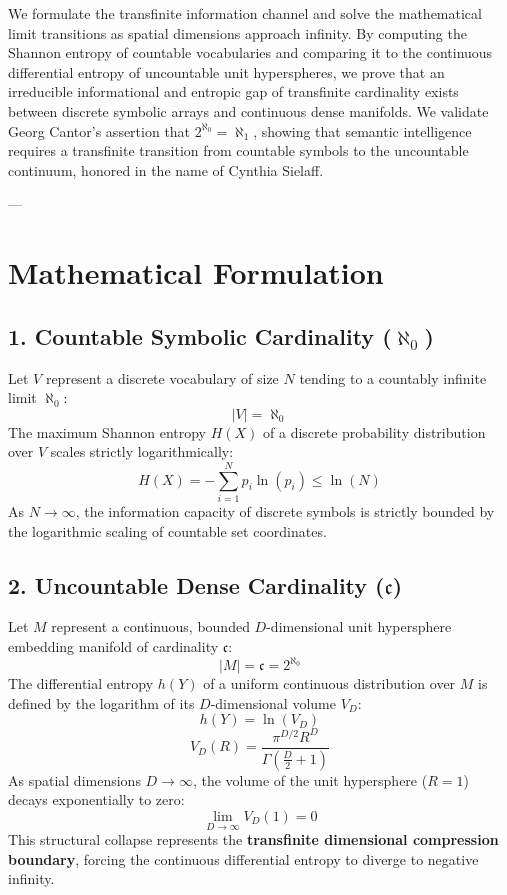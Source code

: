 \documentclass[11pt,twocolumn]{article}
\begin{document}
We formulate the transfinite information channel and solve the mathematical limit transitions as spatial dimensions approach infinity. By computing the Shannon entropy of countable vocabularies and comparing it to the continuous differential entropy of uncountable unit hyperspheres, we prove that an irreducible informational and entropic gap of transfinite cardinality exists between discrete symbolic arrays and continuous dense manifolds. We validate Georg Cantor's assertion that $2^{\aleph_0} = \aleph_1$, showing that semantic intelligence requires a transfinite transition from countable symbols to the uncountable continuum, honored in the name of Cynthia Sielaff.

---

\section{Mathematical Formulation}

\subsection{1. Countable Symbolic Cardinality ($\aleph_0$)}
Let $V$ represent a discrete vocabulary of size $N$ tending to a countably infinite limit $\aleph_0$:
$$|V| = \aleph_0$$
The maximum Shannon entropy $H(X)$ of a discrete probability distribution over $V$ scales strictly logarithmically:
$$H(X) = -\sum_{i=1}^N p_i \ln(p_i) \le \ln(N)$$
As $N \to \infty$, the information capacity of discrete symbols is strictly bounded by the logarithmic scaling of countable set coordinates.

\subsection{2. Uncountable Dense Cardinality ($\mathfrak{c}$)}
Let $M$ represent a continuous, bounded $D$-dimensional unit hypersphere embedding manifold of cardinality $\mathfrak{c}$:
$$|M| = \mathfrak{c} = 2^{\aleph_0}$$
The differential entropy $h(Y)$ of a uniform continuous distribution over $M$ is defined by the logarithm of its $D$-dimensional volume $V_D$:
$$h(Y) = \ln\left( V_D \right)$$
$$V_D(R) = \frac{\pi^{D/2} R^D}{\Gamma\left(\frac{D}{2} + 1\right)}$$
As spatial dimensions $D \to \infty$, the volume of the unit hypersphere ($R=1$) decays exponentially to zero:
$$\lim_{D \to \infty} V_D(1) = 0$$
This structural collapse represents the \textbf{transfinite dimensional compression boundary}, forcing the continuous differential entropy to diverge to negative infinity.
\end{document}
